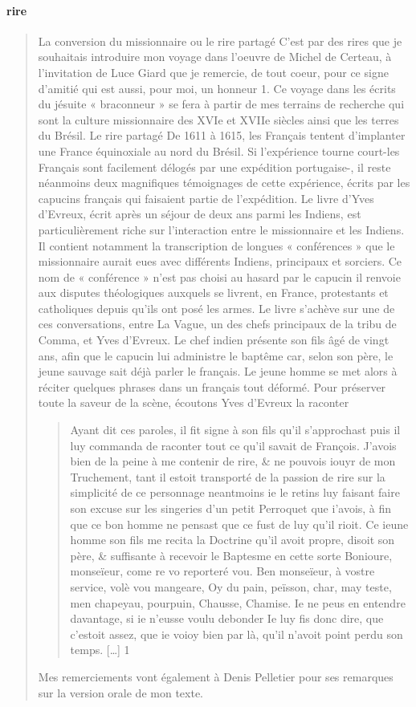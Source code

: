 \paragraph{rire}
\begin{quote}
    La conversion du missionnaire ou le rire partagé C'est par des rires que je souhaitais introduire mon voyage dans l'oeuvre de Michel de Certeau, à l'invitation de Luce Giard que je remercie, de tout coeur, pour ce signe d'amitié qui est aussi, pour moi, un honneur 1. Ce voyage dans les écrits du jésuite « braconneur » se fera à partir de mes terrains de recherche qui sont la culture missionnaire des XVIe et XVIIe siècles ainsi que les terres du Brésil. Le rire partagé De 1611 à 1615, les Français tentent d'implanter une France équinoxiale au nord du Brésil. Si l'expérience tourne court-les Français sont facilement délogés par une expédition portugaise-, il reste néanmoins deux magnifiques témoignages de cette expérience, écrits par les capucins français qui faisaient partie de l'expédition. Le livre d'Yves d'Evreux, écrit après un séjour de deux ans parmi les Indiens, est particulièrement riche sur l'interaction entre le missionnaire et les Indiens. Il contient notamment la transcription de longues « conférences » que le missionnaire aurait eues avec différents Indiens, principaux et sorciers. Ce nom de « conférence » n'est pas choisi au hasard par le capucin   il renvoie aux disputes théologiques auxquels se livrent, en France, protestants et catholiques depuis qu'ils ont posé les armes. Le livre s'achève sur une de ces conversations, entre La Vague, un des chefs principaux de la tribu de Comma, et Yves d'Evreux. Le chef indien présente son fils âgé de vingt ans, afin que le capucin lui administre le baptême car, selon son père, le jeune sauvage sait déjà parler le français. Le jeune homme se met alors à réciter quelques phrases dans un français tout déformé. Pour préserver toute la saveur de la scène, écoutons Yves d'Evreux la raconter   
    \begin{quote}
        Ayant dit ces paroles, il fit signe à son fils qu'il s'approchast   puis il luy commanda de raconter tout ce qu'il savait de François. J'avois bien de la peine à me contenir de rire, \& ne pouvois iouyr de mon Truchement, tant il estoit transporté de la passion de rire sur la simplicité de ce personnage   neantmoins ie le retins luy faisant faire son excuse sur les singeries d'un petit Perroquet que i'avois, à fin que ce bon homme ne pensast que ce fust de luy qu'il rioit. Ce ieune homme son fils me recita la Doctrine qu'il avoit propre, disoit son père, & suffisante à recevoir le Baptesme en cette sorte   Bonioure, monseïeur, come re vo reporteré vou. Ben monseïeur, à vostre service, volè vou mangeare, Oy   du pain, peïsson, char, may teste, men chapeyau, pourpuin, Chausse, Chamise. Ie ne peus en entendre davantage, si ie n'eusse voulu debonder   Ie luy fis donc dire, que c'estoit assez, que ie voioy bien par là, qu'il n'avoit point perdu son temps. […] 1
    \end{quote}
     Mes remerciements vont également à Denis Pelletier pour ses remarques sur la version orale de mon texte.
\end{quote}


